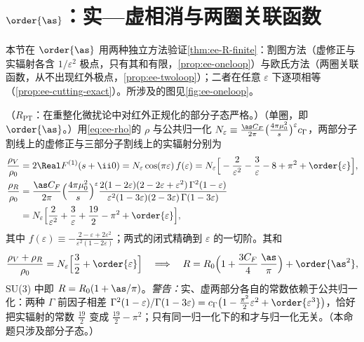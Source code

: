 \section{$\order{\as}$：实—虚相消与两圈关联函数}\label{sec:ee-oneloop}

本节在 $\order{\as}$ 用两种独立方法验证\cref{thm:ee-R-finite}：割图方法（虚修正与实辐射各含 $1/\varepsilon^2$ 极点，只有其和有限，\cref{prop:ee-oneloop}）与欧氏方法（两圈关联函数，从不出现红外极点，\cref{prop:ee-twoloop}）；二者在任意 $\varepsilon$ 下逐项相等（\cref{prop:ee-cutting-exact}）。所涉及的图见\cref{fig:ee-oneloop}。

\begin{proposition}\label{prop:ee-oneloop}
（$R_{\mathrm{PT}}$：在重整化微扰论中对红外正规化的部分子态严格。）（单圈，即 $\order{\as}$。）用\cref{eq:ee-rho}的 $\rho$ 与公共归一化 $N_\varepsilon\equiv\frac{\as C_F}{2\pi}\big(\frac{4\pi\mu_0^2}{s}\big)^{\varepsilon}c_\Gamma$，两部分子割线上的虚修正与三部分子割线上的实辐射分别为
\begin{align}
\frac{\rho_V}{\rho_0}&=2\Real F^{(1)}(s+\ii0)=N_\varepsilon\cos(\pi\varepsilon)\,f(\varepsilon)=N_\varepsilon\Big[-\frac2{\varepsilon^2}-\frac3\varepsilon-8+\pi^2+\order{\varepsilon}\Big], \label{eq:ee-virt}\\
\frac{\rho_R}{\rho_0}&=\frac{\as C_F}{2\pi}\Big(\frac{4\pi\mu_0^2}{s}\Big)^{\varepsilon}\frac{2(1-2\varepsilon)(2-2\varepsilon+\varepsilon^2)\,\Gamma^2(1-\varepsilon)}{\varepsilon^2(1-3\varepsilon)(2-3\varepsilon)\,\Gamma(1-3\varepsilon)}\notag\\
&=N_\varepsilon\Big[\frac2{\varepsilon^2}+\frac3\varepsilon+\frac{19}2-\pi^2+\order{\varepsilon}\Big], \label{eq:ee-real}
\end{align}
其中 $f(\varepsilon)\equiv-\frac{2-\varepsilon+2\varepsilon^2}{\varepsilon^2(1-2\varepsilon)}$；两式的闭式精确到 $\varepsilon$ 的一切阶。其和
\begin{equation}\label{eq:ee-R1}
\frac{\rho_V+\rho_R}{\rho_0}=N_\varepsilon\Big[\frac32+\order{\varepsilon}\Big]\quad\Longrightarrow\quad R=R_0\Big(1+\frac{3C_F}4\,\frac{\as}\pi\Big)+\order{\as^2},
\end{equation}
SU(3) 中即 $R=R_0(1+\as/\pi)$。\emph{警告：}实、虚两部分各自的常数依赖于公共归一化：两种 $\Gamma$ 前因子相差 $\Gamma^2(1-\varepsilon)/\Gamma(1-3\varepsilon)=c_\Gamma\big(1-\frac{\pi^2}2\varepsilon^2+\order{\varepsilon^3}\big)$，恰好把实辐射的常数 $\frac{19}2$ 变成 $\frac{19}2-\pi^2$；只有同一归一化下的和才与归一化无关。（本命题只涉及部分子态。）
\end{proposition}
